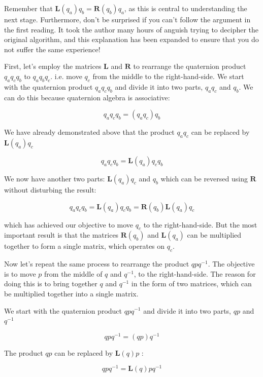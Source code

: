 \documentclass[10pt]{article}
\begin{document}
Remember that $\mathbf{L}\left(q_{a}\right) q_{b}=\mathbf{R}\left(q_{b}\right) q_{a}$, as this is central to understanding the next stage. Furthermore, don't be surprised if you can't follow the argument in the first reading. It took the author many hours of anguish trying to decipher the original algorithm, and this explanation has been expanded to ensure that you do not suffer the same experience!

First, let's employ the matrices $\mathbf{L}$ and $\mathbf{R}$ to rearrange the quaternion product $q_{a} q_{c} q_{b}$ to $q_{a} q_{b} q_{c}$. i.e. move $q_{c}$ from the middle to the right-hand-side. We start with the quaternion product $q_{a} q_{c} q_{b}$ and divide it into two parts, $q_{a} q_{c}$ and $q_{b}$. We can do this because quaternion algebra is associative:

$$
q_{a} q_{c} q_{b}=\left(q_{a} q_{c}\right) q_{b}
$$

We have already demonstrated above that the product $q_{a} q_{c}$ can be replaced by $\mathbf{L}\left(q_{a}\right) q_{c}$

$$
q_{a} q_{c} q_{b}=\mathbf{L}\left(q_{a}\right) q_{c} q_{b}
$$

We now have another two parts: $\mathbf{L}\left(q_{a}\right) q_{c}$ and $q_{b}$ which can be reversed using $\mathbf{R}$ without disturbing the result:

$$
q_{a} q_{c} q_{b}=\mathbf{L}\left(q_{a}\right) q_{c} q_{b}=\mathbf{R}\left(q_{b}\right) \mathbf{L}\left(q_{a}\right) q_{c}
$$

which has achieved our objective to move $q_{c}$ to the right-hand-side. But the most important result is that the matrices $\mathbf{R}\left(q_{b}\right)$ and $\mathbf{L}\left(q_{a}\right)$ can be multiplied together to form a single matrix, which operates on $q_{c}$.

Now let's repeat the same process to rearrange the product $q p q^{-1}$. The objective is to move $p$ from the middle of $q$ and $q^{-1}$, to the right-hand-side. The reason for doing this is to bring together $q$ and $q^{-1}$ in the form of two matrices, which can be multiplied together into a single matrix.

We start with the quaternion product $q p q^{-1}$ and divide it into two parts, $q p$ and $q^{-1}$

$$
q p q^{-1}=(q p) q^{-1}
$$

The product $q p$ can be replaced by $\mathbf{L}(q) p$ :

$$
q p q^{-1}=\mathbf{L}(q) p q^{-1}
$$
\end{document}
